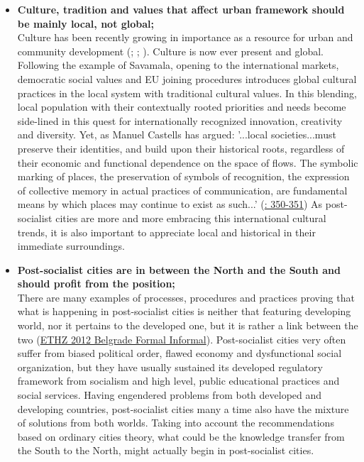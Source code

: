 \documentclass[11pt]{report}
\begin{document}
{\begin{itemize}
\item \textbf{Culture, tradition and values that affect urban framework should be mainly local, not global;}
\\
Culture has been recently growing in importance as a resource for urban  and  community development (\href{Bianchini}{\citealt{Bianchini 1999}}; \href{Mercer}{\citealt{mercer_cultural_2006}}; \href{Volic} {\citealt{volic_belgrade_2012}}).
Culture is now ever present and global.
Following the example of Savamala, opening to the international markets, democratic social values and EU joining procedures introduces global cultural practices in the local system with traditional cultural values. 
In this blending, local population with their contextually rooted priorities and needs become side-lined in this quest for internationally recognized innovation, creativity and diversity.
Yet, as Manuel Castells has
argued:
'...local societies...must preserve their identities, and build upon their historical roots,
regardless of their economic and functional dependence on the space of flows. The
symbolic marking of places, the preservation of symbols of recognition, the expression
of collective memory in actual practices of communication, are fundamental means by
which places may continue to exist as such...' (\href{Castells}{\citealt{castells_informational_1991}: 350-351})
As post-socialist cities are more and more embracing this international cultural trends, it is also important to appreciate local and historical in their immediate surroundings.

\item \textbf{Post-socialist cities are in between the North and the South and should profit from the position;}
\\
There are many examples of processes, procedures and practices proving that what is happening in post-socialist cities is neither that featuring developing world, nor it pertains to the developed one, but it is rather a link between the two (\href{ref}{ETHZ 2012 Belgrade Formal Informal}).
Post-socialist cities very often suffer from biased political order, flawed economy and  dysfunctional social organization, but they have usually sustained its developed regulatory framework from socialism and high level, public educational practices and social services.
Having engendered problems from both developed and developing countries, post-socialist cities many a time also have the mixture of solutions from both worlds. 
Taking into account the recommendations based on ordinary cities theory, what could be the knowledge transfer from the South to the North, might actually begin in post-socialist cities.


\end{itemize}}
\end{document}
